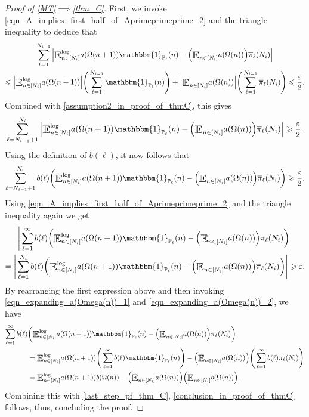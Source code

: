 \documentclass[letter,11pt]{article}
\theoremstyle{plain} %
\theoremstyle{definition} %
\theoremstyle{plain}
\theoremstyle{plain}
\theoremstyle{plain}
\numberwithin{equation}{section}
\renewcommand{\epsilon}{\varepsilon}
\renewcommand{\leq}{\leqslant}
\renewcommand{\geq}{\geqslant}
\renewcommand{\P}{\mathbb{P}}
\newcommand{\E}{\raisebox{-0.4ex}{\scalebox{1.4}[1.3]{$\mathbb{E}$}}}
\newcommand{\Esub}[1]{\raisebox{-0.4ex}{\scalebox{1.4}[1.3]{$\mathbb{E}$}}\raisebox{-0.35ex}{\ensuremath{_{\scriptstyle #1}}}}
\newcommand{\logE}{{\E}^{\log}}
\newcommand{\1}{\mathbbm{1}}
\begin{document}
\begin{proof}[Proof of \cref{MT}$\implies$\cref{thm_C}]
First, we invoke \eqref{eqn_A_implies_first_half_of_Aprimeprimeprime_2} and the triangle inequality to deduce that
\begin{multline*}
\sum_{\ell=1}^{N_{i-1}} \Big|\logE_{n\in[N_i]}  a(\Omega(n+1))\1_{\P_\ell}(n) -\Big(\Esub{n\in[N_i]}a(\Omega(n))\Big)\overline{\pi}_\ell(N_i)\Big| \\
\leq 
\Big|\logE_{n\in[N_i]}a(\Omega(n+1))\Big|\Bigg(\sum_{\ell=1}^{N_{i-1}} \1_{\P_\ell}(n)\Bigg) + \Big|\Esub{n\in[N_i]}a(\Omega(n))\Big|\Bigg(\sum_{\ell=1}^{N_{i-1}} \overline{\pi}_\ell(N_i)\Bigg) 
\leq
\frac{\epsilon}{2}.
\end{multline*}
Combined with \eqref{assumption2_in_proof_of_thmC}, this gives
\[
\sum_{\ell=N_{i-1}+1}^{N_i} \Big|\logE_{n\in[N_i]} a(\Omega(n+1))\1_{\P_\ell}(n)
- \Big(\Esub{n\in[N_i]} a(\Omega(n))\Big)\overline{\pi}_\ell(N_i)\Big|
\geq \frac{\epsilon}{2}.
\]
Using the definition of $b(\ell)$, it now follows that 
\[
\sum_{\ell=N_{i-1}+1}^{N_i} b(\ell)\bigg(\logE_{n\in[N_i]} a(\Omega(n+1))\1_{\P_\ell}(n) 
- \Big(\Esub{n\in[N_i]} a(\Omega(n))\Big)\overline{\pi}_\ell(N_i)\bigg)
\geq \frac{\epsilon}{2}.
\]
Using \eqref{eqn_A_implies_first_half_of_Aprimeprimeprime_2} 
and the triangle inequality again we get
\begin{multline}\label{last_step_pf_thm_C}
    \Bigg|\sum_{\ell=1}^\infty b(\ell) \bigg(\logE_{n\in[N_i]} a(\Omega(n+1))\1_{\P_\ell}(n) - \Big(\Esub{n\in[N_i]} a(\Omega(n))\Big)\overline{\pi}_\ell(N_i)\bigg)\Bigg| \\
    = \Bigg|\sum_{\ell=1}^{N_i} b(\ell) \bigg(\logE_{n\in[N_i]} a(\Omega(n+1))\1_{\P_\ell}(n) - \Big(\Esub{n\in[N_i]} a(\Omega(n))\Big)\overline{\pi}_\ell(N_i)\bigg)\Bigg|
    \geq \epsilon.
\end{multline}
By rearranging the first expression above and then invoking \eqref{eqn_expanding_a(Omega(n))_1} and \eqref{eqn_expanding_a(Omega(n))_2}, 
we have 
\begin{align*}
    \sum_{\ell=1}^\infty b(\ell) & \bigg(\logE_{n\in[N_i]} a(\Omega(n+1))\1_{\P_\ell}(n) - \Big(\Esub{n\in[N_i]} a(\Omega(n))\Big)\overline{\pi}_\ell(N_i)\bigg) \\
    & = \logE_{n\in[N_i]}a(\Omega(n+1))\Bigg(\sum_{\ell=1}^\infty b(\ell)\1_{\P_\ell}(n)\Bigg) - \Big(\Esub{n\in[N_i]}a(\Omega(n))\Big)\Bigg(\sum_{\ell=1}^\infty b(\ell)\overline{\pi}_\ell(N_i)\Bigg) \\
    & = \logE_{n\in[N_i]}a(\Omega(n+1))b(\Omega(n)) - \Big(\Esub{n\in[N_i]}a(\Omega(n))\Big)\Big(\Esub{n\in[N_i]}b(\Omega(n))\Big).
\end{align*}
Combining this with \eqref{last_step_pf_thm_C}, \eqref{conclusion_in_proof_of_thmC} follows, thus, concluding the proof.
\end{proof}
\end{document}
